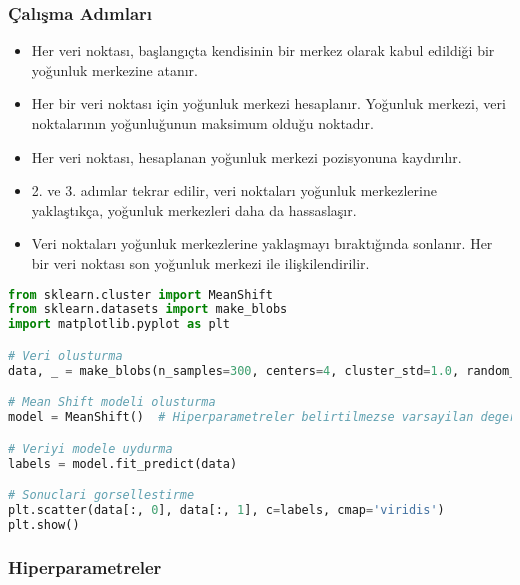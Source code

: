 \subsubsection{Çalışma Adımları}
\begin{itemize}
    \item Her veri noktası, başlangıçta kendisinin bir merkez olarak kabul edildiği bir yoğunluk merkezine atanır.
    \item Her bir veri noktası için yoğunluk merkezi hesaplanır. Yoğunluk merkezi, veri noktalarının yoğunluğunun maksimum olduğu noktadır.
    \item Her veri noktası, hesaplanan yoğunluk merkezi pozisyonuna kaydırılır.
    \item 2. ve 3. adımlar tekrar edilir, veri noktaları yoğunluk merkezlerine yaklaştıkça, yoğunluk merkezleri daha da hassaslaşır.
    \item Veri noktaları yoğunluk merkezlerine yaklaşmayı bıraktığında sonlanır. Her bir veri noktası son yoğunluk merkezi ile ilişkilendirilir.
\end{itemize}

\begin{lstlisting}[language=Python, caption=Scikit-learn'de MeanShift örneği.]
from sklearn.cluster import MeanShift
from sklearn.datasets import make_blobs
import matplotlib.pyplot as plt

# Veri olusturma
data, _ = make_blobs(n_samples=300, centers=4, cluster_std=1.0, random_state=42)

# Mean Shift modeli olusturma
model = MeanShift()  # Hiperparametreler belirtilmezse varsayilan degerler kullanilir

# Veriyi modele uydurma
labels = model.fit_predict(data)

# Sonuclari gorsellestirme
plt.scatter(data[:, 0], data[:, 1], c=labels, cmap='viridis')
plt.show()
\end{lstlisting}

\subsubsection{Hiperparametreler}
\begin{table}[h]
\centering
{\scriptsize\renewcommand{\arraystretch}{0.4}
{}}
\end{table}

